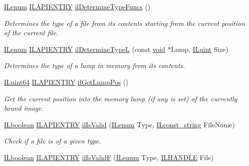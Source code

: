 \begin{DoxyCompactItemize}
\hyperlink{group__il__types_ga62ca73445716183ef42b1f3906a45ed0}{I\+Lenum} \hyperlink{_i_l_8h_a69c08a8d06df986f7e46f209d131ef2f}{I\+L\+A\+P\+I\+E\+N\+T\+R\+Y} \hyperlink{group__file_ga4b9f6b7a5c4a97a916efa67d2ce64546}{il\+Determine\+Type\+Funcs} ()
\begin{DoxyCompactList}\small\item\em Determines the type of a file from its contents starting from the current position of the current file. \end{DoxyCompactList}\item 
\hyperlink{group__il__types_ga62ca73445716183ef42b1f3906a45ed0}{I\+Lenum} \hyperlink{_i_l_8h_a69c08a8d06df986f7e46f209d131ef2f}{I\+L\+A\+P\+I\+E\+N\+T\+R\+Y} \hyperlink{group__file_ga706207244bcf99e76f299c5e43800300}{il\+Determine\+Type\+L} (const \hyperlink{_i_l_8h_a5530e04d947bcddd83639ea7940faf10}{void} $\ast$Lump, \hyperlink{group__il__types_gaff8e86a1072c8d7cfe387fb87c6ed8e1}{I\+Luint} Size)
\begin{DoxyCompactList}\small\item\em Determines the type of a lump in memory from its contents. \end{DoxyCompactList}\item 
\hyperlink{_i_l_8h_aa33b96b79711d5cdf00317ce911f7c77}{I\+Luint64} \hyperlink{_i_l_8h_a69c08a8d06df986f7e46f209d131ef2f}{I\+L\+A\+P\+I\+E\+N\+T\+R\+Y} \hyperlink{group__file_gad3dba757768898d1833540d6c7a3686b}{il\+Get\+Lump\+Pos} ()
\begin{DoxyCompactList}\small\item\em Get the current position into the memory lump (if any is set) of the currently bound image. \end{DoxyCompactList}\item 
\hyperlink{group__il__types_gaa6aa7c95cfdc06b4d8601ef832b7bb0a}{I\+Lboolean} \hyperlink{_i_l_8h_a69c08a8d06df986f7e46f209d131ef2f}{I\+L\+A\+P\+I\+E\+N\+T\+R\+Y} \hyperlink{group__file_ga41b3e8904b94c4b4956a99cdaeda99ae}{il\+Is\+Valid} (\hyperlink{group__il__types_ga62ca73445716183ef42b1f3906a45ed0}{I\+Lenum} Type, \hyperlink{group__il__types_ga1aa1edc3eb344e14acacb02bade24a5a}{I\+Lconst\+\_\+string} File\+Name)
\begin{DoxyCompactList}\small\item\em Check if a file is of a given type. \end{DoxyCompactList}\item 
\hyperlink{group__il__types_gaa6aa7c95cfdc06b4d8601ef832b7bb0a}{I\+Lboolean} \hyperlink{_i_l_8h_a69c08a8d06df986f7e46f209d131ef2f}{I\+L\+A\+P\+I\+E\+N\+T\+R\+Y} \hyperlink{group__file_ga758c5fd4ff61cd47530442cfac50f4c3}{il\+Is\+Valid\+F} (\hyperlink{group__il__types_ga62ca73445716183ef42b1f3906a45ed0}{I\+Lenum} Type, \hyperlink{_i_l_8h_a2e3e6f3fab1fa3764f0802258f702d10}{I\+L\+H\+A\+N\+D\+L\+E} File)

\end{DoxyCompactItemize}
